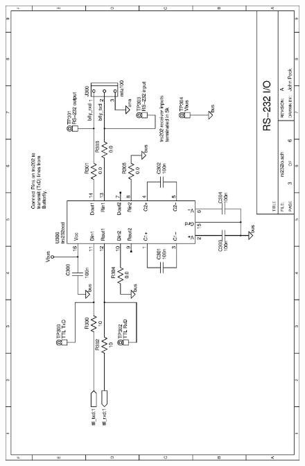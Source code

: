 \begin{figure}[ht]
    \begin{center}
          \vspace{0.4cm}
          \includegraphics[clip,height=\textheight]
          {schematics/usb/rs232io}
          \label{sch:rs232io}
    \end{center} 
\end{figure}

